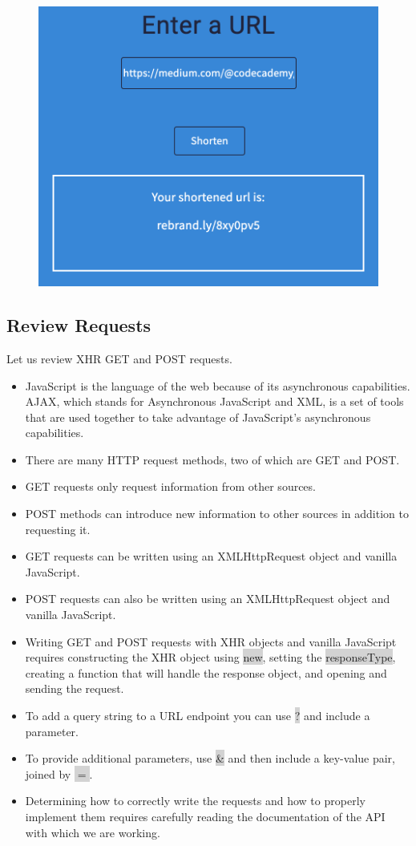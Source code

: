 \documentclass[11pt]{article}
\begin{document}
\begin{figure}[H]
\includegraphics[scale = 0.5]{17_5}
\centering
\end{figure}

\subsection{Review Requests}
Let us review XHR GET and POST requests.
\begin{itemize}[leftmargin = *]
\item JavaScript is the language of the web because of its asynchronous capabilities. AJAX, which stands for Asynchronous JavaScript and XML, is a set of tools that are used together to take advantage of JavaScript’s asynchronous capabilities.
\item There are many HTTP request methods, two of which are GET and POST.
\item GET requests only request information from other sources.
\item POST methods can introduce new information to other sources in addition to requesting it.
\item GET requests can be written using an XMLHttpRequest object and vanilla JavaScript.
\item POST requests can also be written using an XMLHttpRequest object and vanilla JavaScript.
\item Writing GET and POST requests with XHR objects and vanilla JavaScript requires constructing the XHR object using \colorbox{lightgray}{new}, setting the \colorbox{lightgray}{responseType}, creating a function that will handle the response object, and opening and sending the request.
\item To add a query string to a URL endpoint you can use \colorbox{lightgray}{?} and include a parameter.
\item To provide additional parameters, use \colorbox{lightgray}{\&} and then include a key-value pair, joined by \colorbox{lightgray}{$=$}.
\item Determining how to correctly write the requests and how to properly implement them requires carefully reading the documentation of the API with which we are working.
\end{itemize}
\end{document}
